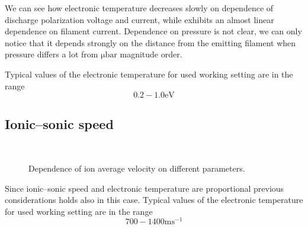 \documentclass[11pt,a4 paper]{article}
\begin{document}
We can see how electronic temperature decreases slowly on dependence of discharge polarization voltage and current, while exhibits an almost linear dependence on filament current. Dependence on pressure is not clear, we can only notice that it depends strongly on the distance from the emitting filament when pressure differs a lot from $\si{\micro\bar}$ magnitude order.

Typical values of the electronic temperature for used working setting are in the range 
\[0.2-1.0\si\electronvolt\]

\subsection{Ionic--sonic speed}
\begin{figure}[H]
\\%
 \caption{Dependence of ion average velocity on different parameters.}\label{fig:cs}%
\end{figure}%
Since ionic--sonic speed and electronic temperature are proportional previous considerations holds also in this case. 
Typical values of the electronic temperature for used working setting are in the range 
\[700-1400\si{\metre\second^{-1}}\]
\end{document}
